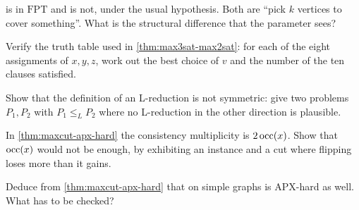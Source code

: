 \begin{exercise}
 is in $\mathrm{FPT}$ and  is not,
under the usual hypothesis. Both are ``pick $k$ vertices to cover something''.
What is the structural difference that the parameter sees?
\end{exercise}

\begin{exercise}
Verify the truth table used in \cref{thm:max3sat-max2sat}: for each of the eight
assignments of $x,y,z$, work out the best choice of $v$ and the number of the
ten clauses satisfied.
\end{exercise}

\begin{exercise}
Show that the definition of an L-reduction is not symmetric: give two problems
$P_1, P_2$ with $P_1 \le_L P_2$ where no L-reduction in the other direction is
plausible.
\end{exercise}

\begin{exercise}
In \cref{thm:maxcut-apx-hard} the consistency multiplicity is $2\operatorname{occ}(x)$. Show
that $\operatorname{occ}(x)$ would not be enough, by exhibiting an instance and a cut where
flipping loses more than it gains.
\end{exercise}

\begin{exercise}
Deduce from \cref{thm:maxcut-apx-hard} that  on simple graphs is
APX-hard as well. What has to be checked?
\end{exercise}
